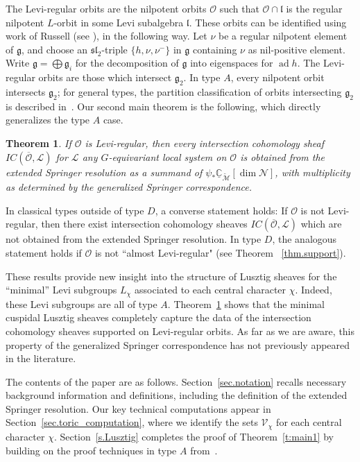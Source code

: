 \documentclass[reqno,11pt]{amsart}
\newtheorem{Thm}{Theorem}[section]
\theoremstyle{remark}
\theoremstyle{remark}
\theoremstyle{definition}
\theoremstyle{definition}
\theoremstyle{definition}
\numberwithin{equation}{section}
\newcommand{\C}{\mathbb{C}}           %
\newcommand{\ad}{\operatorname{ad}}             %
\newcommand{\fg}{{\mathfrak g}}
\newcommand{\fl}{{\mathfrak l}}
\newcommand{\cl}{\mathcal{L}}
\newcommand{\cm}{\mathcal{M}}
\newcommand{\cn}{\mathcal{N}}
\newcommand{\co}{\mathcal{O}}
\newcommand{\toric}{\mathcal{V}}
\newcommand{\shc}{\underline{\C}}
\renewcommand{\tilde}{\widetilde}
\begin{document}
The Levi-regular orbits are the nilpotent orbits $\co$ such that $\co \cap \fl$ is the regular nilpotent $L$-orbit in some Levi subalgebra $\fl$.
These orbits can be identified using work of Russell (see \cite{Russell}),
in the following way.  Let $\nu$ be a regular nilpotent element of $\fg$, and choose an $\mathfrak{sl}_2$-triple $\{h, \nu, \nu^-\}$ in $\fg$ containing $\nu$ as nil-positive element.  Write $\fg = \bigoplus \fg_i$ for the decomposition of $\fg$ into eigenspaces for $\ad h$.  The Levi-regular orbits are those which intersect $\fg_2$.  In type $A$, every nilpotent orbit intersects $\fg_2$;
for general types, the partition classification of orbits intersecting 
$\fg_2$ is described in~\cite{Russell}.  Our second main theorem is the following, which directly generalizes the type $A$ case.

\begin{Thm} \label{t:main2}
If $\co$ is Levi-regular, then every intersection cohomology sheaf $IC(\overline{\co}, \cl)$ for $\cl$ any $G$-equivariant local system on $\co$ is obtained from the extended Springer resolution as a summand of  $\psi_* \shc_{\tilde{\cm}}[\dim \cn] $, with multiplicity as determined by the generalized Springer correspondence.
\end{Thm}

In classical types outside of type $D$, a converse statement holds: If $\co$ is not Levi-regular, then there exist intersection cohomology sheaves $IC(\overline{\co}, \cl)$ which
are not obtained from the extended Springer resolution.  In type $D$, the analogous statement holds if $\co$ is not  ``almost Levi-regular"  (see Theorem ~\ref{thm.support}).

These results provide new insight into the structure of Lusztig sheaves for the ``minimal'' Levi subgroups $L_\chi$ associated to each central character $\chi$. Indeed, these Levi subgroups are all of type $A$. Theorem~\ref{t:main2} shows that the minimal cuspidal Lusztig sheaves completely capture the data of the intersection cohomology sheaves supported on Levi-regular orbits. As far as we are aware, this property of the generalized Springer correspondence has not previously appeared in the literature. 


The contents of the paper are as follows. Section~\ref{sec.notation} recalls necessary background information and definitions, including the definition of the extended Springer resolution. Our key technical computations appear in Section~\ref{sec.toric_computation}, where we identify the sets $\toric_\chi$ for each central character $\chi$. Section~\ref{s.Lusztig} completes the proof of Theorem~\ref{t:main1} by
building on the proof techniques in type $A$ from~\cite{GPR23}.  
\end{document}
